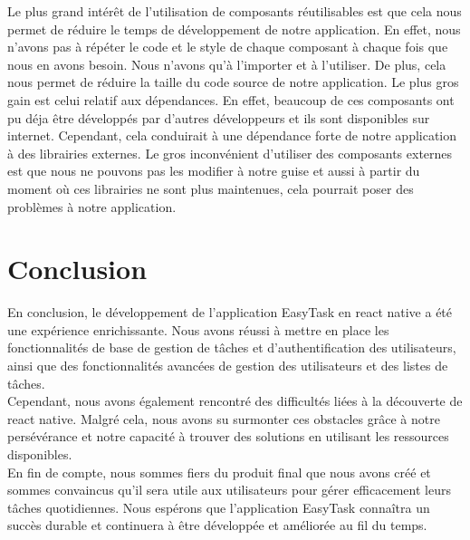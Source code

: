 \documentclass[12pt]{article}
\begin{document}
        Le plus grand intérêt de l'utilisation de composants réutilisables est que cela nous permet de réduire le temps de développement
        de notre application. En effet, nous n'avons pas à répéter le code et le style de chaque composant à chaque fois que nous en avons besoin.
        Nous n'avons qu'à l'importer et à l'utiliser. De plus, cela nous permet de réduire la taille du code source de notre application. Le plus
        gros gain est celui relatif aux dépendances. En effet, beaucoup de ces composants ont pu déja être développés par d'autres
        développeurs et ils sont disponibles sur internet. Cependant, cela conduirait à une dépendance forte de notre application à des librairies
        externes. Le gros inconvénient d'utiliser des composants externes est que nous ne pouvons pas les modifier à notre guise et
        aussi à partir du moment où ces librairies ne sont plus maintenues, cela pourrait poser des problèmes à notre application.

        \section{Conclusion}\label{sec:conclusion}
        En conclusion, le développement de l'application EasyTask en react native a été une expérience enrichissante.
        Nous avons réussi à mettre en place les fonctionnalités de base de gestion de tâches et d'authentification des utilisateurs,
        ainsi que des fonctionnalités avancées de gestion des utilisateurs et des listes de tâches.\\

        Cependant, nous avons également rencontré des difficultés liées à la découverte de react native. Malgré cela,
        nous avons su surmonter ces obstacles grâce à notre persévérance et notre capacité à trouver des solutions en
        utilisant les ressources disponibles.\\

        En fin de compte, nous sommes fiers du produit final que nous avons créé et sommes convaincus qu'il sera utile
        aux utilisateurs pour gérer efficacement leurs tâches quotidiennes. Nous espérons que l'application EasyTask
        connaîtra un succès durable et continuera à être développée et améliorée au fil du temps.
        \newpage
        \listoffigures
\end{document}
